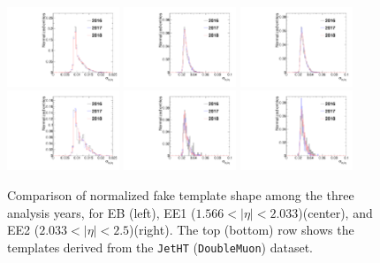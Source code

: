 \begin{figure}[!htbp]
\centering
\includegraphics[width=0.3\textwidth]{fig/sieie_comparison_EB_jetht_pt130To150_chIso5To10.pdf}
\includegraphics[width=0.3\textwidth]{fig/sieie_comparison_EE1_jetht_pt130To150_chIso5To10.pdf}
\includegraphics[width=0.3\textwidth]{fig/sieie_comparison_EE2_jetht_pt130To150_chIso5To10.pdf}\\
\includegraphics[width=0.3\textwidth]{fig/sieie_comparison_EB_doublemuon_pt130To150_chIso5To10.pdf}
\includegraphics[width=0.3\textwidth]{fig/sieie_comparison_EE1_doublemuon_pt130To150_chIso5To10.pdf}
\includegraphics[width=0.3\textwidth]{fig/sieie_comparison_EE2_doublemuon_pt130To150_chIso5To10.pdf}
\caption{Comparison of normalized fake template shape among the three analysis years, for EB (left), EE1 ($1.566 < |\eta| < 2.033$)(center), and EE2 ($2.033 < \lvert \eta \rvert< 2.5$)(right). The top (bottom) row shows the templates derived from the \texttt{JetHT} (\texttt{DoubleMuon}) dataset.}
\label{fig:fake_templates_by_year}
\end{figure}

